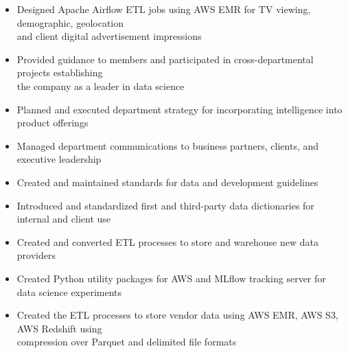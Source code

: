 
\ProjectExperienceExpandedOneSectionCont
{\begin{itemize}
    \item Designed Apache Airflow ETL jobs using AWS EMR for TV viewing, demographic, geolocation
    \\and client digital advertisement impressions
\end{itemize}}
{\begin{itemize}
    \item Provided guidance to members and participated in cross-departmental projects
    establishing \\the company as a leader in data science
    \item Planned and executed department strategy for incorporating intelligence into product
    offerings
    \item Managed department communications to business partners, clients, and executive leadership
    \item Created and maintained standards for data and development guidelines
    \item Introduced and standardized first and third-party data dictionaries for internal and
    client use
    \item Created and converted ETL processes to store and warehouse new data providers
    \item Created Python utility packages for AWS and MLflow tracking server for data science
    experiments
    \item Created the ETL processes to store vendor data using AWS EMR, AWS S3, AWS Redshift using
    \\compression over Parquet and delimited file formats
\end{itemize}}

\vspace*{0.05 in}

